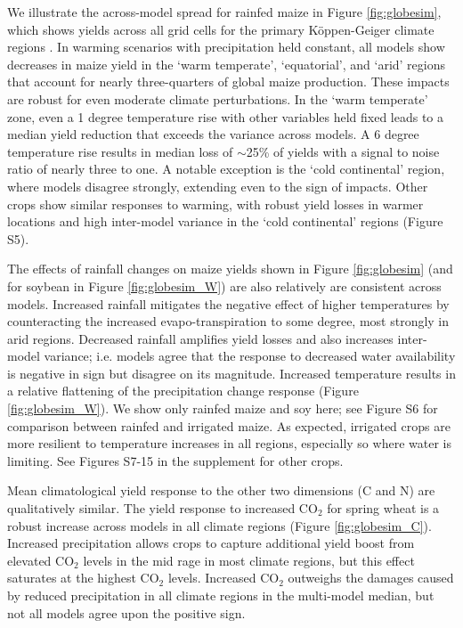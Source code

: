 \documentclass[gmd, manuscript]{copernicus} %
\begin{document}
We illustrate the across-model spread for rainfed maize in Figure \ref{fig:globesim}, which shows yields across all grid cells for the primary K\"{o}ppen-Geiger climate regions \citep{rubel2010}. 
In warming scenarios with precipitation held constant, all models show decreases in maize yield in the `warm temperate', `equatorial', and `arid' regions that account for nearly three-quarters of global maize production. 
These impacts are robust for even moderate climate perturbations. 
In the `warm temperate' zone, even a 1 degree temperature rise with other variables held fixed leads to a median yield reduction that exceeds the variance across models. 
A 6 degree temperature rise results in median loss of $\sim$25\% of yields with a signal to noise ratio of nearly three to one. A notable exception is the `cold continental' region, where models disagree strongly, extending even to the sign of impacts. 
Other crops show similar responses to warming, with robust yield losses in warmer locations and high inter-model variance in the `cold continental' regions (Figure S5).

The effects of rainfall changes on maize yields shown in Figure \ref{fig:globesim} (and for soybean in Figure \ref{fig:globesim_W}) are also relatively are consistent across models. 
Increased rainfall mitigates the negative effect of higher temperatures by counteracting the increased evapo-transpiration to some degree, most strongly in arid regions.
Decreased rainfall amplifies yield losses and also increases inter-model variance; i.e. models agree that the response to decreased water availability is negative in sign but disagree on its magnitude.
Increased temperature results in a relative flattening of the precipitation change response (Figure \ref{fig:globesim_W}).
We show only rainfed maize and soy here; see Figure S6 for comparison between rainfed and irrigated maize. As expected, irrigated crops are more resilient to temperature increases in all regions, especially so where water is limiting. 
See Figures S7-15 in the supplement for other crops.   

Mean climatological yield response to the other two dimensions (C and N) are qualitatively similar. 
The yield response to increased CO$_2$ for spring wheat is a robust increase across models in all climate regions (Figure \ref{fig:globesim_C}). 
Increased precipitation allows crops to capture additional yield boost from elevated CO$_2$ levels in the mid rage in most climate regions, but this effect saturates at the highest CO$_2$ levels. 
Increased CO$_2$ outweighs the damages caused by reduced precipitation in all climate regions in the multi-model median, but not all models agree upon the positive sign.
\end{document}
